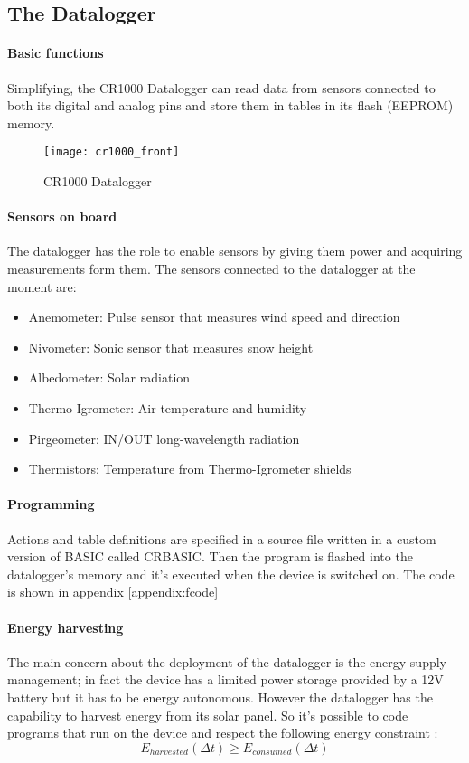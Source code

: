 \subsection{The Datalogger}
\paragraph{Basic functions \cite{cmp1}}
Simplifying, the CR1000 Datalogger can read data from sensors connected to both its digital and analog pins and store them in tables in its flash (EEPROM) memory.
\begin{figure}
	\centering
	\texttt{[image: cr1000\_front]}
	\caption{CR1000 Datalogger}
	\label{fig:cr1000}
\end{figure}
\paragraph{Sensors on board \cite{avv1}}
The datalogger has the role to enable sensors by giving them power and acquiring measurements form them. The sensors connected to the datalogger at the moment are:
\begin{itemize}
    \item Anemometer: Pulse sensor that measures wind speed and direction
    \item Nivometer: Sonic sensor that measures snow height
    \item Albedometer: Solar radiation
    \item Thermo-Igrometer: Air temperature and humidity
    \item Pirgeometer: IN/OUT long-wavelength radiation
    \item Thermistors: Temperature from Thermo-Igrometer shields
\end{itemize}
\paragraph{Programming}
Actions and table definitions are specified in a source file written in a custom version of BASIC called CRBASIC. Then the program is flashed into the datalogger's memory and it's executed when the device is switched on. The code is shown in appendix \ref{appendix:fcode}
\paragraph{Energy harvesting}
The main concern about the deployment of the datalogger is the energy supply management; in fact the device has a limited power storage provided by a 12V battery but it has to be energy autonomous. However the datalogger has the capability to harvest energy from its solar panel. So it's possible to code programs that run on the device and respect the following energy constraint \cite{avv1}:
\begin{equation}
    E_{harvested}(\Delta t) \geq E_{consumed}(\Delta t)
\end{equation}